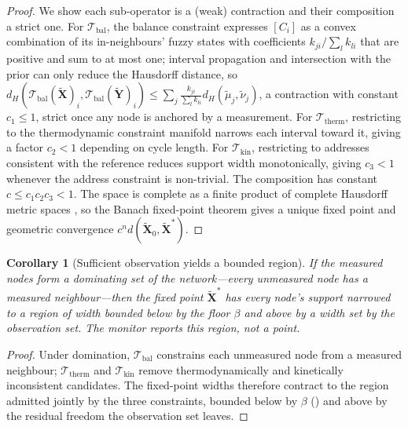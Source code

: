 \documentclass[11pt,twocolumn,a4paper]{article}
\theoremstyle{thmstyle}
\newtheorem{corollary}[theorem]{Corollary}
\theoremstyle{definition}
\theoremstyle{remark}
\newcommand{\floorc}{\beta}
\begin{document}
\begin{proof}
We show each sub-operator is a (weak) contraction and their composition a
strict one. For $\mathcal{T}_{\mathrm{bal}}$, the balance constraint
expresses $[C_i]$ as a convex combination of its in-neighbours' fuzzy
states with coefficients $k_{ji}/\sum_l k_{li}$ that are positive and sum
to at most one; interval propagation and intersection with the prior can
only reduce the Hausdorff distance, so
$d_H(\mathcal{T}_{\mathrm{bal}}(\widetilde{\mathbf X})_i,
\mathcal{T}_{\mathrm{bal}}(\widetilde{\mathbf Y})_i)
\le\sum_{j}\frac{k_{ji}}{\sum_l k_{li}}
d_H(\tilde\mu_j,\tilde\nu_j)$, a contraction with constant $c_1\le1$,
strict once any node is anchored by a measurement. For
$\mathcal{T}_{\mathrm{therm}}$, restricting to the thermodynamic constraint
manifold narrows each interval toward it, giving a factor $c_2<1$
depending on cycle length. For $\mathcal{T}_{\mathrm{kin}}$, restricting to
addresses consistent with the reference reduces support width
monotonically, giving $c_3<1$ whenever the address constraint is
non-trivial. The composition has constant $c\le c_1 c_2 c_3<1$. The space
is complete as a finite product of complete Hausdorff metric spaces
\citep{zadeh1965fuzzy}, so the Banach fixed-point theorem
\citep{banach1922operations} gives a unique fixed point and geometric
convergence $c^n d(\widetilde{\mathbf X}_0,\widetilde{\mathbf X}^\ast)$.
\end{proof}

\begin{corollary}[Sufficient observation yields a bounded region]
\label{cor:observability}
If the measured nodes form a dominating set of the network---every
unmeasured node has a measured neighbour---then the fixed point
$\widetilde{\mathbf X}^\ast$ has every node's support narrowed to a region
of width bounded below by the floor $\floorc$ and above by a width set by
the observation set. The monitor reports this region, not a point.
\end{corollary}

\begin{proof}
Under domination, $\mathcal{T}_{\mathrm{bal}}$ constrains each unmeasured
node from a measured neighbour; $\mathcal{T}_{\mathrm{therm}}$ and
$\mathcal{T}_{\mathrm{kin}}$ remove thermodynamically and kinetically
inconsistent candidates. The fixed-point widths therefore contract to the
region admitted jointly by the three constraints, bounded below by
$\floorc$ () and above by the residual freedom the
observation set leaves.
\end{proof}
\end{document}
